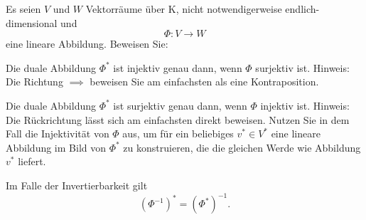 \begin{Problem}
	Es seien $V$ und $W$ Vektorräume über K, nicht notwendigerweise endlich-dimensional und
	\[
	\Phi:V\to W
	\]
	eine lineare Abbildung. Beweisen Sie:
	\begin{parts}
	\item Die duale Abbildung $\Phi^*$ ist injektiv genau dann, wenn $\Phi$ surjektiv ist.
		{\footnotesize Hinweis: Die Richtung $\implies$ beweisen Sie am einfachsten als eine Kontraposition.}
	\item Die duale Abbildung $\Phi^*$ ist surjektiv genau dann, wenn $\Phi$ injektiv ist.
		{\footnotesize Hinweis: Die Rückrichtung lässt sich am einfachsten direkt beweisen. Nutzen Sie in dem Fall die Injektivität von $\Phi$ aus, um f\"{u}r ein beliebiges $v^*\in V^*$ eine lineare Abbildung im Bild von $\Phi^*$ zu konstruieren, die die gleichen Werde wie Abbildung $v^*$ liefert.}
	\item Im Falle der Invertierbarkeit gilt
		\[
			\left( \Phi^{-1} \right) ^*=\left( \Phi^* \right) ^{-1}
		.\] 
	\end{parts}
\end{Problem}
